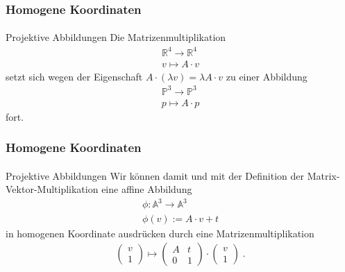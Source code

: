 \documentclass{beamer}
\begin{document}
\begin{frame}
    \frametitle{Homogene Koordinaten}
\framesubtitle{}
\begin{block}{Projektive Abbildungen}
Die Matrizenmultiplikation
\begin{align*}
\mathbb{R}^{4} \to \mathbb{R}^{4} \\
v \mapsto A \cdot v
\end{align*}
setzt sich wegen der Eigenschaft $A \cdot (\lambda v) = \lambda A \cdot v$ zu einer Abbildung
\begin{align*}
\mathbb{P}^{3} \to \mathbb{P}^{3} \\
p \mapsto A \cdot p
\end{align*}
fort. 
\end{block}
\end{frame}

\begin{frame}
    \frametitle{Homogene Koordinaten}
\framesubtitle{}
\begin{block}{Projektive Abbildungen}
Wir können damit und mit der Definition der Matrix-Vektor-Multiplikation eine affine Abbildung 
\begin{align*}
\phi : \mathbb{A}^{3} \to \mathbb{A}^{3} \\
\phi(v):=  A \cdot v + t
\end{align*}
in homogenen Koordinate ausdrücken durch eine Matrizenmultiplikation
\begin{align*}
\begin{pmatrix} v \\ 1\end{pmatrix} \mapsto \begin{pmatrix}  A  & t  \\ 0 &1\end{pmatrix} \cdot  \begin{pmatrix} v \\ 1\end{pmatrix}   \; .
\end{align*}
\end{block}
\end{frame}
\end{document}
